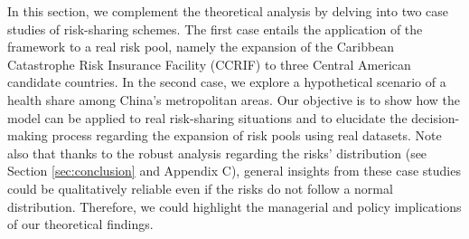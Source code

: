 \documentclass[fleqn,mnsc,nonblindrev]{informs4}
\begin{document}
In this section, we complement the theoretical analysis by delving into two case studies of risk-sharing schemes. The first case entails the application of the framework to a real risk pool, namely the expansion of the Caribbean Catastrophe Risk Insurance Facility (CCRIF) to three Central American candidate countries. In the second case, we explore a hypothetical scenario of a health share among China's metropolitan areas. Our objective is to show how the model can be applied to real risk-sharing situations and to elucidate the decision-making process regarding the expansion of risk pools using real datasets. Note also that thanks to the robust analysis regarding the risks' distribution (see Section \ref{sec:conclusion} and Appendix C), general insights from these case studies could be qualitatively reliable even if the risks do not follow a normal distribution. Therefore, we could highlight the managerial and policy implications of our theoretical findings.
\end{document}
